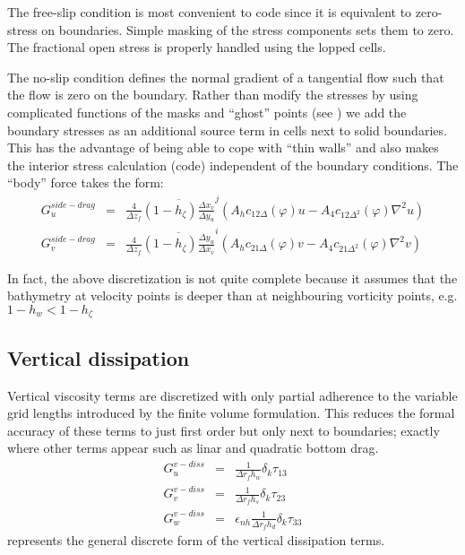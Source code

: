The free-slip condition is most convenient to code since it is
equivalent to zero-stress on boundaries. Simple masking of the stress
components sets them to zero. The fractional open stress is properly
handled using the lopped cells.

The no-slip condition defines the normal gradient of a tangential flow
such that the flow is zero on the boundary. Rather than modify the
stresses by using complicated functions of the masks and ``ghost''
points (see \cite{Adcroft+Marshall98}) we add the boundary stresses as
an additional source term in cells next to solid boundaries. This has
the advantage of being able to cope with ``thin walls'' and also makes
the interior stress calculation (code) independent of the boundary
conditions. The ``body'' force takes the form:
\begin{eqnarray}
G_u^{side-drag} & = &
\frac{4}{\Delta z_f} \overline{ (1-h_\zeta) \frac{\Delta x_v}{\Delta y_u} }^j
\left( A_h c_{12\Delta}(\varphi) u - A_4 c_{12\Delta^2}(\varphi) \nabla^2 u \right)
\\
G_v^{side-drag} & = &
\frac{4}{\Delta z_f} \overline{ (1-h_\zeta) \frac{\Delta y_u}{\Delta x_v} }^i
\left( A_h c_{21\Delta}(\varphi) v - A_4 c_{21\Delta^2}(\varphi) \nabla^2 v \right)
\end{eqnarray}

In fact, the above discretization is not quite complete because it
assumes that the bathymetry at velocity points is deeper than at
neighbouring vorticity points, e.g. $1-h_w < 1-h_\zeta$



\subsection{Vertical dissipation}

Vertical viscosity terms are discretized with only partial adherence
to the variable grid lengths introduced by the finite volume
formulation. This reduces the formal accuracy of these terms to just
first order but only next to boundaries; exactly where other terms
appear such as linar and quadratic bottom drag.
\begin{eqnarray}
G_u^{v-diss} & = &
\frac{1}{\Delta r_f h_w} \delta_k \tau_{13} \\
G_v^{v-diss} & = &
\frac{1}{\Delta r_f h_s} \delta_k \tau_{23} \\
G_w^{v-diss} & = & \epsilon_{nh}
\frac{1}{\Delta r_f h_d} \delta_k \tau_{33}
\end{eqnarray}
represents the general discrete form of the vertical dissipation terms.

